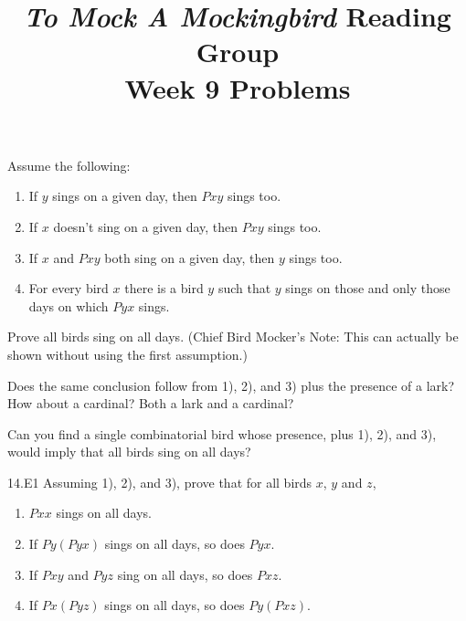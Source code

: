\documentclass[12pt, letterpaper]{article}
\title{\emph{To Mock A Mockingbird} Reading Group\\Week 9 Problems}
\begin{document}
\maketitle

\disclaimer

\begin{prob}{14.1} 
Assume the following:

\begin{enumerate}[label=\textbf{\arabic*)},itemsep=0mm]
  \item If $y$ sings on a given day, then $Pxy$ sings too.
  \item If $x$ doesn't sing on a given day, then $Pxy$ sings too.
  \item If $x$ and $Pxy$ both sing on a given day, then $y$ sings too.
  \item For every bird $x$ there is a bird $y$ such that $y$ sings on those and only those days on which $Pyx$ sings.
\end{enumerate}

\noindent Prove all birds sing on all days. (Chief Bird Mocker's Note: This can actually be shown without using the first assumption.)
\end{prob}

\begin{prob}{14.2} 
Does the same conclusion follow from 1), 2), and 3) plus the presence of a lark? How about a cardinal? Both a lark and a cardinal?
\end{prob}

\begin{prob}{14.3} 
Can you find a single combinatorial bird whose presence, plus 1), 2), and 3), would imply that all birds sing on all days?
\end{prob}

\begin{prob}{14.E1}
Assuming 1), 2), and 3), prove that for all birds $x$, $y$ and $z$, 
\end{prob}

\begin{enumerate}[label=\textbf{\alph*)},itemsep=0mm]
    \item $Pxx$ sings on all days.
    \item If $Py(Pyx)$ sings on all days, so does $Pyx$.
    \item If $Pxy$ and $Pyz$ sing on all days, so does $Pxz$.
    \addtocounter{enumi}{1}
    \item If $Px(Pyz)$ sings on all days, so does $Py(Pxz)$.
\end{enumerate}
\end{document}
